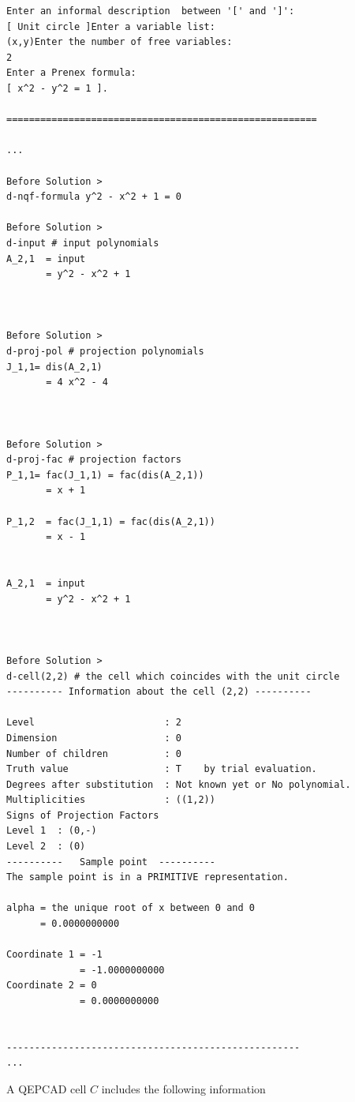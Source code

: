 \documentclass[
]{book}
\theoremstyle{definition}
\theoremstyle{definition}
\theoremstyle{definition}
\theoremstyle{definition}
\theoremstyle{remark}
\begin{document}
\begin{verbatim}
Enter an informal description  between '[' and ']':
[ Unit circle ]Enter a variable list:
(x,y)Enter the number of free variables:
2
Enter a Prenex formula:
[ x^2 - y^2 = 1 ].

=======================================================

...

Before Solution >
d-nqf-formula y^2 - x^2 + 1 = 0

Before Solution >
d-input # input polynomials
A_2,1  = input
       = y^2 - x^2 + 1



Before Solution >
d-proj-pol # projection polynomials
J_1,1= dis(A_2,1)
       = 4 x^2 - 4



Before Solution >
d-proj-fac # projection factors
P_1,1= fac(J_1,1) = fac(dis(A_2,1))
       = x + 1

P_1,2  = fac(J_1,1) = fac(dis(A_2,1))
       = x - 1


A_2,1  = input
       = y^2 - x^2 + 1



Before Solution >
d-cell(2,2) # the cell which coincides with the unit circle
---------- Information about the cell (2,2) ----------

Level                       : 2
Dimension                   : 0
Number of children          : 0
Truth value                 : T    by trial evaluation.
Degrees after substitution  : Not known yet or No polynomial.
Multiplicities              : ((1,2))
Signs of Projection Factors
Level 1  : (0,-)
Level 2  : (0)
----------   Sample point  ----------
The sample point is in a PRIMITIVE representation.

alpha = the unique root of x between 0 and 0
      = 0.0000000000

Coordinate 1 = -1
             = -1.0000000000
Coordinate 2 = 0
             = 0.0000000000


----------------------------------------------------
...
\end{verbatim}

A QEPCAD cell \(C\) includes the following information
\end{document}
